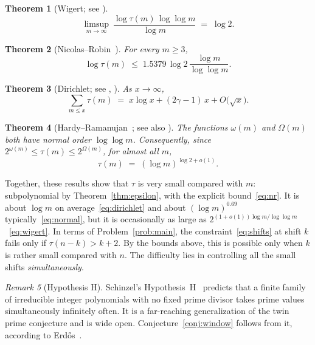\documentclass[11pt]{amsart}
\theoremstyle{plain}
\newtheorem{theorem}{Theorem}[section]
\theoremstyle{definition}
\theoremstyle{remark}
\newtheorem{remark}[theorem]{Remark}
\numberwithin{equation}{section}
\begin{document}
\begin{theorem}[Wigert; see {\cite[Ch.~18]{HardyWright2008}}]\label{thm:wigert}
\begin{equation}\label{eq:wigert}
  \limsup_{m\to\infty}\ \frac{\log\tau(m)\,\log\log m}{\log m}\;=\;\log 2 .
\end{equation}
\end{theorem}

\begin{theorem}[Nicolas--Robin~\cite{NicolasRobin1983}]\label{thm:nicolas-robin}
For every $m\ge 3$,
\begin{equation}\label{eq:nr}
  \log\tau(m)\;\le\; 1.5379\,\log 2\,\frac{\log m}{\log\log m}.
\end{equation}
\end{theorem}

\begin{theorem}[Dirichlet; see {\cite[Ch.~18]{HardyWright2008}}, {\cite[Ch.~3]{Apostol1976}}]\label{thm:dirichlet}
As $x\to\infty$,
\begin{equation}\label{eq:dirichlet}
  \sum_{m\le x}\tau(m)\;=\;x\log x+(2\gamma-1)\,x+O\bigl(\sqrt{x}\bigr).
\end{equation}
\end{theorem}

\begin{theorem}[Hardy--Ramanujan~\cite{HardyRamanujan1917}; see also {\cite[Ch.~22]{HardyWright2008}}]\label{thm:hr}
The functions $\omega(m)$ and $\Omega(m)$ both have normal order $\log\log m$. Consequently, since $2^{\omega(m)}\le\tau(m)\le 2^{\Omega(m)}$, for almost all $m$,
\begin{equation}\label{eq:normal}
  \tau(m)\;=\;(\log m)^{\log 2+o(1)}.
\end{equation}
\end{theorem}

Together, these results show that $\tau$ is very small compared with $m$: subpolynomial by Theorem~\ref{thm:epsilon}, with the explicit bound~\eqref{eq:nr}. It is about $\log m$ on average~\eqref{eq:dirichlet} and about $(\log m)^{0.69}$ typically~\eqref{eq:normal}, but it is occasionally as large as $2^{(1+o(1))\log m/\log\log m}$~\eqref{eq:wigert}. In terms of Problem~\ref{prob:main}, the constraint~\eqref{eq:shifts} at shift $k$ fails only if $\tau(n-k)>k+2$. By the bounds above, this is possible only when $k$ is rather small compared with $n$. The difficulty lies in controlling all the small shifts \emph{simultaneously}.

\begin{remark}[Hypothesis H]
Schinzel's Hypothesis~H~\cite{SchinzelSierpinski1958} predicts that a finite family of irreducible integer polynomials with no fixed prime divisor takes prime values simultaneously infinitely often. It is a far-reaching generalization of the twin prime conjecture and is wide open. Conjecture~\ref{conj:window} follows from it, according to Erd\H{o}s~\cite{Erdos1979Acta}.
\end{remark}
\end{document}
